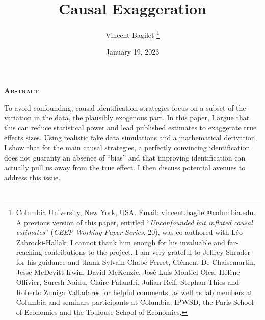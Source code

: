 \documentclass[usletter, 12pt]{article}
\begin{document}

	
	\title{Causal Exaggeration}

	\author{Vincent Bagilet
		\thanks{Columbia University, New York, USA. Email: \url{vincent.bagilet@columbia.edu}. 
			A previous version of this paper, entitled ``\textit{Unconfounded but inflated causal estimates}'' (\textit{CEEP Working Paper Series}, 20), was co-authored with Léo Zabrocki-Hallak; I cannot thank him enough for his invaluable and far-reaching contributions to the project. I am very grateful to Jeffrey Shrader for his guidance and thank Sylvain Chabé-Ferret, Clément De Chaisemartin, Jesse McDevitt-Irwin, David McKenzie, José Luis Montiel Olea, Hélène Ollivier, Suresh Naidu, Claire Palandri, Julian Reif, Stephan Thies and Roberto Zuniga Valladares for helpful comments, as well as lab members at Columbia and seminars participants at Columbia, IPWSD, the Paris School of Economics and the Toulouse School of Economics.}
	}
	

	\date{January 19, 2023}
	
	
	\maketitle
	
	\begin{center}
		\large \textsc{\textbf{Abstract}}\\
	\end{center}
		
		To avoid confounding, causal identification strategies focus on a subset of the variation in the data, the plausibly exogenous part. In this paper, I argue that this can reduce statistical power and lead published estimates to exaggerate true effects sizes. Using realistic fake data simulations and a mathematical derivation, I show that for the main causal strategies, a perfectly convincing identification does not guaranty an absence of ``bias'' and that improving identification can actually pull us away from the true effect. I then discuss potential avenues to address this issue.\\~\\
		
		
\end{document}
